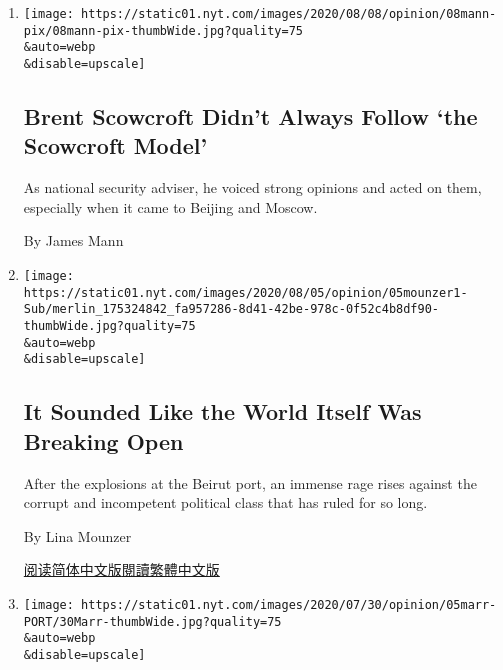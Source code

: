 \begin{enumerate}
\def\labelenumi{\arabic{enumi}.}
\item
  \href{/2020/08/08/opinion/brent-scowcroft-model-foreign-policy.html}{}

  \texttt{[image: https://static01.nyt.com/images/2020/08/08/opinion/08mann-pix/08mann-pix-thumbWide.jpg?quality=75\\\&auto=webp\\\&disable=upscale]}

  \hypertarget{brent-scowcroft-didnt-always-follow-the-scowcroft-model}{%
  \subsection{Brent Scowcroft Didn't Always Follow `the Scowcroft
  Model'}\label{brent-scowcroft-didnt-always-follow-the-scowcroft-model}}

  As national security adviser, he voiced strong opinions and acted on
  them, especially when it came to Beijing and Moscow.

  By James Mann
\item
  \href{/2020/08/05/opinion/beirut-port-explosions.html}{}

  \texttt{[image: https://static01.nyt.com/images/2020/08/05/opinion/05mounzer1-Sub/merlin\_175324842\_fa957286-8d41-42be-978c-0f52c4b8df90-thumbWide.jpg?quality=75\\\&auto=webp\\\&disable=upscale]}

  \hypertarget{it-sounded-like-the-world-itself-was-breaking-open}{%
  \subsection{It Sounded Like the World Itself Was Breaking
  Open}\label{it-sounded-like-the-world-itself-was-breaking-open}}

  After the explosions at the Beirut port, an immense rage rises against
  the corrupt and incompetent political class that has ruled for so
  long.

  By Lina Mounzer

  \href{https://cn.nytimes.com/opinion/20200806/beirut-port-explosions/}{阅读简体中文版}\href{https://cn.nytimes.com/opinion/20200806/beirut-port-explosions/zh-hant/}{閱讀繁體中文版}
\item
  \href{/pt/2020/08/05/opinion/international-world/coronavirus-esta-no-ar.html}{}

  \texttt{[image: https://static01.nyt.com/images/2020/07/30/opinion/05marr-PORT/30Marr-thumbWide.jpg?quality=75\\\&auto=webp\\\&disable=upscale]}

  \hypertarget{sim-o-coronavuxedrus-estuxe1-no-ar}{%
}
\end{enumerate}
